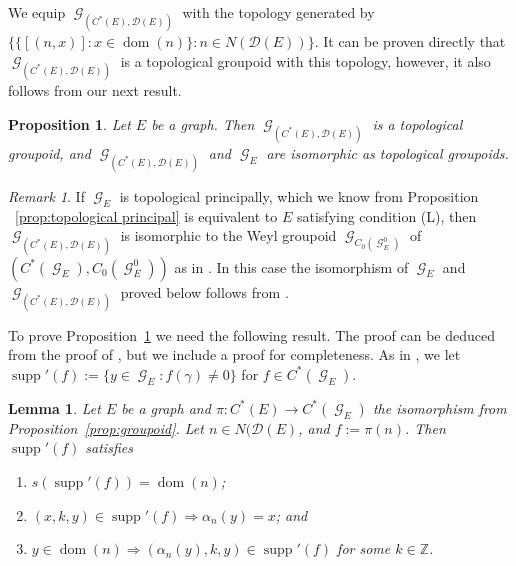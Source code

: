 \documentclass[12pt, a4paper]{amsart}
\numberwithin{equation}{section}
\newtheorem{lemma}[thm]{Lemma}
\newtheorem{prop}[thm]{Proposition}
\theoremstyle{definition}
\theoremstyle{remark}
\newtheorem{remark}[thm]{Remark}
\begin{document}
We equip ${\operatorname{\mathcal{G}}}_{(C^*(E),\mathcal{D}(E))}$ with the topology generated by 
$\{\{[(n,x)]:x\in{{\operatorname{dom}}}(n)\}:n\in N(\mathcal{D}(E))\}$. It can be proven directly that ${\operatorname{\mathcal{G}}}_{(C^*(E),\mathcal{D}(E))}$ is a topological groupoid with this topology, however, it also follows from our next result. 

\begin{prop}\label{prop:weyl}
Let $E$ be a graph. Then ${\operatorname{\mathcal{G}}}_{(C^*(E),\mathcal{D}(E))}$ is a topological groupoid, and ${\operatorname{\mathcal{G}}}_{(C^*(E),\mathcal{D}(E))}$ and ${\operatorname{\mathcal{G}}}_E$ are 
isomorphic as topological groupoids.
\end{prop}

\begin{remark}\label{rem: the Weyl groupoid case}
If ${\operatorname{\mathcal{G}}}_E$ is topological principally, which we know from Proposition 
~\ref{prop:topological principal} is equivalent to $E$ satisfying condition 
(L), then ${\operatorname{\mathcal{G}}}_{(C^*(E),\mathcal{D}(E))}$ is isomorphic to the Weyl groupoid 
${\operatorname{\mathcal{G}}}_{C_0({\operatorname{\mathcal{G}}}_E^0)}$ of $(C^*({\operatorname{\mathcal{G}}}_E),C_0({\operatorname{\mathcal{G}}}_E^0))$ as in \cite{Ren2}. In 
this case the 
isomorphism of ${\operatorname{\mathcal{G}}}_E$ and ${\operatorname{\mathcal{G}}}_{(C^*(E),\mathcal{D}(E))}$ proved below 
follows from \cite[Proposition 4.14]{Ren2}.
\end{remark}

To prove Proposition~\ref{prop:weyl} we need the following result. The proof can be deduced from the proof of \cite[Proposition 
4.8]{Ren2}, but we include a proof for completeness. As in \cite{Ren2}, we let ${\operatorname{supp}}'(f):=\{y\in{\operatorname{\mathcal{G}}}_E:f(\gamma)\ne 0\}$ for $f\in C^*({\operatorname{\mathcal{G}}}_E)$.

\begin{lemma}\label{lem: support of f}
Let $E$ be a graph and $\pi:C^*(E)\to C^*({\operatorname{\mathcal{G}}}_E)$ the isomorphism from Proposition~\ref{prop:groupoid}. Let $n\in N({\mathcal{D}}(E)$, and $f:=\pi(n)$. Then ${\operatorname{supp}}'(f)$ 
satisfies  
\begin{enumerate}
\item[(i)] $s({\operatorname{supp}}'(f))={{\operatorname{dom}}}(n)$;
\item[(ii)] $(x,k,y)\in{\operatorname{supp}}'(f)\Longrightarrow \alpha_n(y)=x$; and
\item[(iii)] $y\in{{\operatorname{dom}}}(n)\Longrightarrow (\alpha_n(y),k,y)\in {\operatorname{supp}}'(f)$ for some $k\in{\mathbb{Z}}$. 
\end{enumerate} 
\end{lemma}
\end{document}
